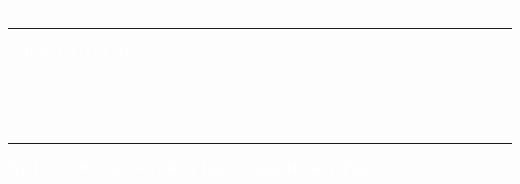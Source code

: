 \begin{titlepage}
\AddToShipoutPicture*{\BackgroundPic}

{ \includegraphics{Images/pixel.png}\\[2cm] 
\raggedleft

\Huge \bfseries \textcolor{white}{\hrule 
\vspace{5mm}CORINA MANUAL}\\[3mm] 
\large{\textcolor{white}{For users and developers
\vspace{5mm}
\hrule}}

\vspace{3cm}
}

{
\normalsize
\raggedleft\textbf{\textcolor{white}{By Peter W.\ Brewer, Ken Harris, and Robert Pohl}}\\[0.6cm]
}

\vfill

{\footnotesize
}

\end{titlepage}